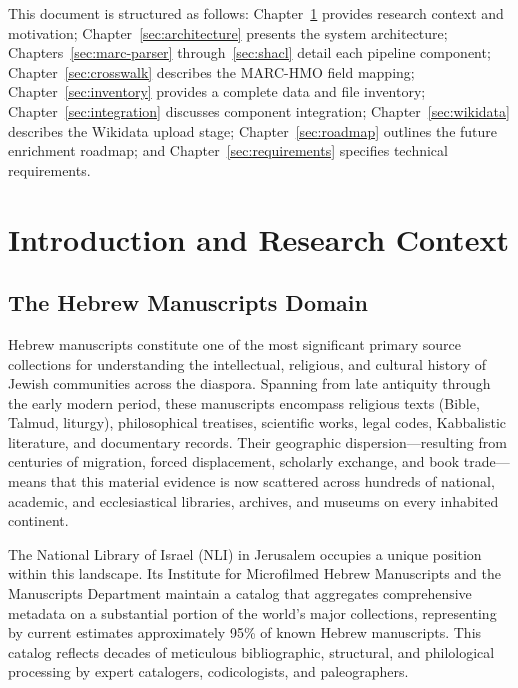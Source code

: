 \documentclass[12pt]{article}
\begin{document}
This document is structured as follows: Chapter~\ref{sec:introduction} provides research context and motivation; Chapter~\ref{sec:architecture} presents the system architecture; Chapters~\ref{sec:marc-parser} through~\ref{sec:shacl} detail each pipeline component; Chapter~\ref{sec:crosswalk} describes the MARC-HMO field mapping; Chapter~\ref{sec:inventory} provides a complete data and file inventory; Chapter~\ref{sec:integration} discusses component integration; Chapter~\ref{sec:wikidata} describes the Wikidata upload stage; Chapter~\ref{sec:roadmap} outlines the future enrichment roadmap; and Chapter~\ref{sec:requirements} specifies technical requirements.


\section{Introduction and Research Context}
\label{sec:introduction}

\subsection{The Hebrew Manuscripts Domain}

Hebrew manuscripts constitute one of the most significant primary source collections for understanding the intellectual, religious, and cultural history of Jewish communities across the diaspora. Spanning from late antiquity through the early modern period, these manuscripts encompass religious texts (Bible, Talmud, liturgy), philosophical treatises, scientific works, legal codes, Kabbalistic literature, and documentary records. Their geographic dispersion---resulting from centuries of migration, forced displacement, scholarly exchange, and book trade---means that this material evidence is now scattered across hundreds of national, academic, and ecclesiastical libraries, archives, and museums on every inhabited continent.

The National Library of Israel (NLI) in Jerusalem occupies a unique position within this landscape. Its Institute for Microfilmed Hebrew Manuscripts and the Manuscripts Department maintain a catalog that aggregates comprehensive metadata on a substantial portion of the world's major collections, representing by current estimates approximately 95\% of known Hebrew manuscripts. This catalog reflects decades of meticulous bibliographic, structural, and philological processing by expert catalogers, codicologists, and paleographers.
\end{document}
